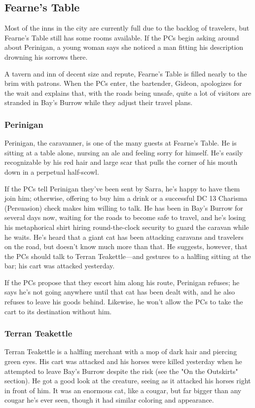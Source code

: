 \documentclass[10pt,a4paper,twoside,bg=print,twocolumn,openany,nodeprecatedcode]{dndbook}
\begin{document}
\subsection{Fearne's Table}
Most of the inns in the city are currently full due to the backlog of travelers, but Fearne's Table still has some rooms available. If the PCs begin asking around about Perinigan, a young woman says she noticed a man fitting his description drowning his sorrows there.

A tavern and inn of decent size and repute, Fearne's Table is filled nearly to the brim with patrons. When the PCs enter, the bartender, Gideon, apologizes for the wait and explains that, with the roads being unsafe, quite a lot of visitors are stranded in Bay's Burrow while they adjust their travel plans.

\subsubsection{Perinigan}
Perinigan, the caravanner, is one of the many guests at Fearne's Table. He is sitting at a table alone, nursing an ale and feeling sorry for himself. He's easily recognizable by his red hair and large scar that pulls the corner of his mouth down in a perpetual half-scowl.

If the PCs tell Perinigan they've been sent by Sarra, he's happy to have them join him; otherwise, offering to buy him a drink or a successful DC 13 Charisma (Persuasion) check makes him willing to talk. He has been in Bay's Burrow for several days now, waiting for the roads to become safe to travel, and he's losing his metaphorical shirt hiring round-the-clock security to guard the caravan while he waits. He's heard that a giant cat has been attacking caravans and travelers on the road, but doesn't know much more than that. He suggests, however, that the PCs should talk to Terran Teakettle—and gestures to a halfling sitting at the bar; his cart was attacked yesterday.

If the PCs propose that they escort him along his route, Perinigan refuses; he says he's not going anywhere until that cat has been dealt with, and he also refuses to leave his goods behind. Likewise, he won't allow the PCs to take the cart to its destination without him.

\subsubsection{Terran Teakettle}
Terran Teakettle is a halfling merchant with a mop of dark hair and piercing green eyes. His cart was attacked and his horses were killed yesterday when he attempted to leave Bay's Burrow despite the risk (see the "On the Outskirts" section). He got a good look at the creature, seeing as it attacked his horses right in front of him. It was an enormous cat, like a cougar, but far bigger than any cougar he's ever seen, though it had similar coloring and appearance.
\end{document}
